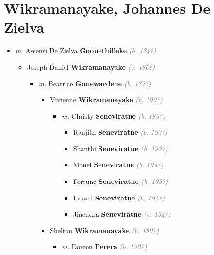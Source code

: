 \documentclass[10pt, openany]{book}
\begin{document}
\chapter{Wikramanayake, Johannes De Zielva}
\label{00003817}
\textcolor{slmaroon}{\textit{}}
\begin{itemize}
\item{\textit{m.} Assensi De Zielva \textbf{Goonethilleke} \textcolor{gray}{\textit{(b. 184?)}}   \label{couple:00003817:00003818} \begin{itemize}
\item{Joseph Daniel \textbf{Wikramanayake} \textcolor{gray}{\textit{(b. 186?)}}
\begin{itemize}
\item{\textit{m.} Beatrice \textbf{Gunewardene} \textcolor{gray}{\textit{(b. 187?)}}   \label{couple:00003819:00003820} \begin{itemize}
\item{Vivienne \textbf{Wikramanayake} \textcolor{gray}{\textit{(b. 190?)}}
\begin{itemize}
\item{\textit{m.} Christy \textbf{Seneviratne} \textcolor{gray}{\textit{(b. 189?)}}   \label{couple:00003821:00003822} \begin{itemize}
\item{Ranjith \textbf{Seneviratne} \textcolor{gray}{\textit{(b. 192?)}}
 }
\item{Shanthi \textbf{Seneviratne} \textcolor{gray}{\textit{(b. 193?)}}
 }
\item{Manel \textbf{Seneviratne} \textcolor{gray}{\textit{(b. 193?)}}
 }
\item{Fortune \textbf{Seneviratne} \textcolor{gray}{\textit{(b. 193?)}}
 }
\item{Lakshi \textbf{Seneviratne} \textcolor{gray}{\textit{(b. 194?)}}
 }
\item{Jinendra \textbf{Seneviratne} \textcolor{gray}{\textit{(b. 194?)}}
 }
\end{itemize}}
\end{itemize}
 }
\item{Shelton \textbf{Wikramanayake} \textcolor{gray}{\textit{(b. 190?)}}
\begin{itemize}
\item{\textit{m.} Doreen \textbf{Perera} \textcolor{gray}{\textit{(b. 190?)}}   \label{couple:00003829:00003830} \begin{itemize}

\end{itemize}}
\end{itemize}}
\end{itemize}}
\end{itemize}}
\end{itemize}}
\end{itemize}
\end{document}
